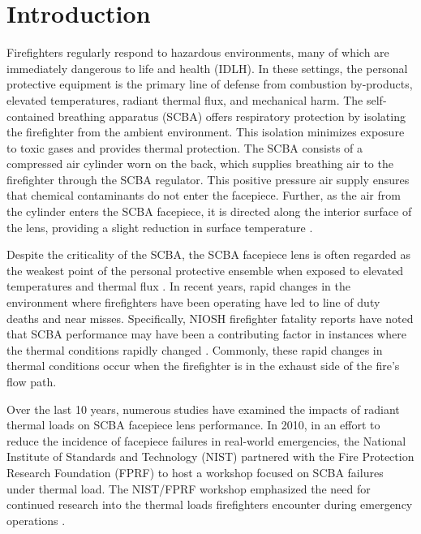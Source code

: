 \documentclass[sn-mathphys]{sn-jnl}%
\theoremstyle{thmstyleone}%
\theoremstyle{thmstyletwo}%
\theoremstyle{thmstylethree}%
\begin{document}

\maketitle

\section{Introduction}\label{sec1}

Firefighters regularly respond to hazardous environments, many of which are immediately dangerous to life and health (IDLH). In these settings, the personal protective equipment is the primary line of defense from combustion by-products, elevated temperatures, radiant thermal flux, and mechanical harm.  The self-contained breathing apparatus (SCBA) offers respiratory protection by isolating the firefighter from the ambient environment. This isolation minimizes exposure to toxic gases and provides thermal protection. The SCBA consists of a compressed air cylinder worn on the back, which supplies breathing air to the firefighter through the SCBA regulator. This positive pressure air supply ensures that chemical contaminants do not enter the facepiece. Further, as the air from the cylinder enters the SCBA facepiece, it is directed along the interior surface of the lens, providing a slight reduction in surface temperature \cite{mensch_fire_2011}.

Despite the criticality of the SCBA, the SCBA facepiece lens is often regarded as the weakest point of the personal protective ensemble when exposed to elevated temperatures and thermal flux \cite{mensch_fire_2011,national_fire_protection_association_nfpa_2012}. In recent years, rapid changes in the environment where firefighters have been operating have led to line of duty deaths and near misses. Specifically, NIOSH firefighter fatality reports have noted that SCBA performance may have been a contributing factor in instances where the thermal conditions rapidly changed \cite{romano_career_2003,berardinelli_volunteer_2008,bowyer_career_2008,wertman_volunteer_2009,merinar_career_2010,bib1}. Commonly, these rapid changes in thermal conditions occur when the firefighter is in the exhaust side of the fire’s flow path.

Over the last 10 years, numerous studies have examined the impacts of radiant thermal loads on SCBA facepiece lens performance. In 2010, in an effort to reduce the incidence of facepiece failures in real-world emergencies, the National Institute of Standards and Technology (NIST) partnered with the Fire Protection Research Foundation (FPRF) to host a workshop focused on SCBA failures under thermal load. The NIST/FPRF workshop emphasized the need for continued research into the thermal loads firefighters encounter during emergency operations \cite{mensch_emergency_2011}. 
\end{document}

